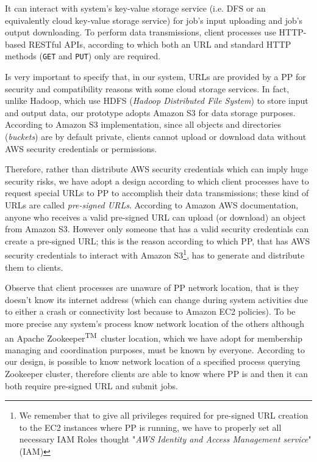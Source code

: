 \documentclass[sigchi]{acmart}
\begin{document}
It can interact with system's key-value storage service (i.e. DFS or an equivalently cloud key-value storage service) for job's input uploading and job's output downloading. To perform data transmissions, client processes use HTTP-based RESTful APIs, according to which both an URL and standard HTTP methods (\texttt{GET} and \texttt{PUT}) only are required.

Is very important to specify that, in our system, URLs are provided by a PP for security and compatibility reasons with some cloud storage services. In fact, unlike Hadoop, which use HDFS (\textit{Hadoop Distributed File System}) to store input and output data, our prototype adopts Amazon S3 for data storage purposes. According to Amazon S3 implementation, since all objects and directories (\textit{buckets}) are by default private, clients cannot upload or download data without AWS security credentials or permissions.

Therefore, rather than distribute AWS security credentials which can imply huge security risks, we have adopt a design according to which client processes have to request special URLs to PP to accomplish their data transmissions; these kind of URLs are called \textit{pre-signed URLs}. According to Amazon AWS documentation, anyone who receives a valid pre-signed URL can upload (or download) an object from Amazon S3. However only someone that has a valid security credentials can create a pre-signed URL; this is the reason according to which PP, that has AWS security credentials to interact with Amazon S3\footnote{We remember that to give all privileges required for pre-signed URL creation to the EC2 instances where PP is running, we have to properly set all necessary IAM Roles thought "\textit{AWS Identity and Access Management service}" (IAM)}, has to generate and distribute them to clients.

Observe that client processes are unaware of PP network location, that is they doesn't know its internet address (which can change during system activities due to either a crash or connectivity lost because to Amazon EC2 policies). To be more precise any system's process know network location of the others although an Apache Zookeeper\textsuperscript{TM}\ cluster location, which we have adopt for membership managing and coordination purposes, must be known by everyone. According to our design, is possible to know network location of a specified process querying Zookeeper cluster, therefore clients are able to know where PP is and then it can both require pre-signed URL and submit jobs.
\end{document}
